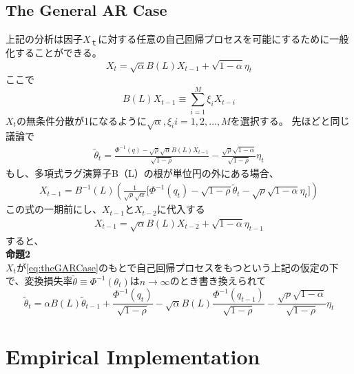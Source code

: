 \documentclass[a4j,12pt]{jarticle}
\begin{document}
\subsection{The General AR Case}
上記の分析は因子$X_ｔ$に対する任意の自己回帰プロセスを可能にするために一般化することができる。
\begin{equation}
X_t = \sqrt{\alpha}B(L)X_{t-1}+\sqrt{1-\alpha}\eta_t
\label{eq:theGARCase}
\end{equation}
ここで
\begin{equation}
B(L)X_{t-1}\equiv\sum_{i=1}^{M}\xi_i X_{t-i}
\end{equation}
$X_t$の無条件分散が1になるように$\sqrt{\alpha},\xi_i i=1,2,\dots,M$を選択する。
先ほどと同じ議論で
\begin{eqnarray}
\tilde{\theta}_t=\frac{\Phi^{-1}(q)-\sqrt{\rho}\sqrt{\alpha}B(L)X_{t-1}}{\sqrt{1-\rho}}-
\frac{\sqrt{\rho}\sqrt{1-\alpha}}{\sqrt{1-\rho}}\eta_t
\end{eqnarray}
もし、多項式ラグ演算子B（L）の根が単位円の外にある場合、
\begin{eqnarray}
X_{t-1}=B^{-1}(L)(\frac{1}{\sqrt{\rho}\sqrt{\alpha}}\bigl[\Phi^{-1}(q_t)-\sqrt{1-\rho}\tilde{\theta}_t-\sqrt{\rho}\sqrt{1-\alpha}\eta_t\bigr])
\end{eqnarray}
この式の一期前にし、$X_{t-1}$と$X_{t-2}$に代入する
\begin{eqnarray}
X_{t-1}=\sqrt{\alpha}B(L)X_{t-2}+\sqrt{1-\alpha}\eta_{t-1}
\end{eqnarray}
すると、\\
{\bf 命題2}\\
\indent $X_t$が\eqref{eq:theGARCase}のもとで自己回帰プロセスをもつという上記の仮定の下で、変換損失率$\tilde{\theta}\equiv\Phi^{-1}(\theta_t)$は$n\rightarrow\infty$のとき書き換えられて
\begin{equation}
\tilde{\theta}_t=\alpha B(L)\tilde{\theta}_{t-1}+\frac{\Phi^{-1}(q_t)}{\sqrt{1-\rho}}
-\sqrt{\alpha}B(L)\frac{\Phi^{-1}(q_{t-1})}{\sqrt{1-\rho}}
-\frac{\sqrt{\rho}\sqrt{1-\alpha}}{\sqrt{1-\rho}}\eta_t
\end{equation}
\section{Empirical Implementation}
\end{document}
